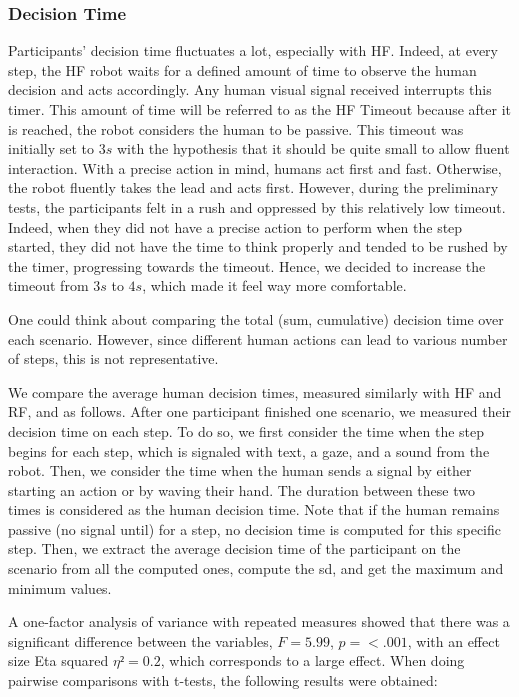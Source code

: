 \subsubsection*{Decision Time}
Participants' decision time fluctuates a lot, especially with HF. Indeed, at every step, the HF robot waits for a defined amount of time to observe the human decision and acts accordingly. Any human visual signal received interrupts this timer. This amount of time will be referred to as the HF Timeout because after it is reached, the robot considers the human to be passive. This timeout was initially set to $3s$ with the hypothesis that it should be quite small to allow fluent interaction. With a precise action in mind, humans act first and fast. Otherwise, the robot fluently takes the lead and acts first. However, during the preliminary tests, the participants felt in a rush and oppressed by this relatively low timeout. Indeed, when they did not have a precise action to perform when the step started, they did not have the time to think properly and tended to be rushed by the timer, progressing towards the timeout. Hence, we decided to increase the timeout from $3s$ to $4s$, which made it feel way more comfortable. 

One could think about comparing the total (sum, cumulative) decision time over each scenario. However, since different human actions can lead to various number of steps, this is not representative. 

We compare the average human decision times, measured similarly with HF and RF, and as follows. After one participant finished one scenario, we measured their decision time on each step. To do so, we first consider the time when the step begins for each step, which is signaled with text, a gaze, and a sound from the robot. Then, we consider the time when the human sends a signal by either starting an action or by waving their hand. The duration between these two times is considered as the human decision time. Note that if the human remains passive (no signal until) for a step, no decision time is computed for this specific step. Then, we extract the average decision time of the participant on the scenario from all the computed ones, compute the \acrshort{sd}, and get the maximum and minimum values. 

A one-factor analysis of variance with repeated measures showed that there was a significant difference between the variables, $F = 5.99$, $p = <.001$, with an effect size Eta squared $\eta² = 0.2$, which corresponds to a large effect.
When doing pairwise comparisons with t-tests, the following results were obtained:

